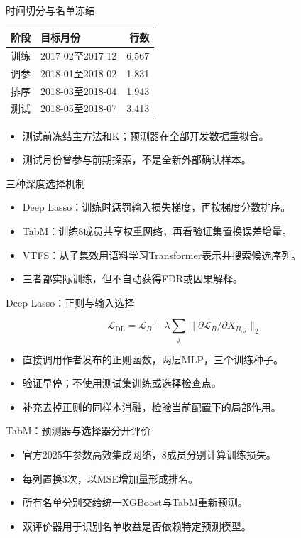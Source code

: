 \documentclass[aspectratio=169]{beamer}
\begin{document}
\begin{frame}{时间切分与名单冻结}
\small \begin{tabular}{llr}
\toprule
阶段 & 目标月份 & 行数\\\midrule
训练 & 2017-02至2017-12 & 6,567\\
调参 & 2018-01至2018-02 & 1,831\\
排序 & 2018-03至2018-04 & 1,943\\
测试 & 2018-05至2018-07 & 3,413\\
\bottomrule
\end{tabular}\begin{itemize}
\item 测试前冻结主方法和K；预测器在全部开发数据重拟合。
\item 测试月份曾参与前期探索，不是全新外部确认样本。
\end{itemize}
\end{frame}
\begin{frame}{三种深度选择机制}
\begin{itemize}
\item Deep Lasso：训练时惩罚输入损失梯度，再按梯度分数排序。
\item TabM：训练8成员共享权重网络，再看验证集置换误差增量。
\item VTFS：从子集效用语料学习Transformer表示并搜索候选序列。
\item 三者都实际训练，但不自动获得FDR或因果解释。
\end{itemize}
\end{frame}
\begin{frame}{Deep Lasso：正则与输入选择}

\[
\mathcal L_{\mathrm{DL}}=\mathcal L_B+
\lambda\sum_j\|\partial\mathcal L_B/\partial X_{B,j}\|_2
\]
\begin{itemize}
\item 直接调用作者发布的正则函数，两层MLP，三个训练种子。
\item 验证早停；不使用测试集训练或选择检查点。
\item 补充去掉正则的同样本消融，检验当前配置下的局部作用。
\end{itemize}
\end{frame}
\begin{frame}{TabM：预测器与选择器分开评价}
\begin{itemize}
\item 官方2025年参数高效集成网络，8成员分别计算训练损失。
\item 每列置换3次，以MSE增加量形成排名。
\item 所有名单分别交给统一XGBoost与TabM重新预测。
\item 双评价器用于识别名单收益是否依赖特定预测模型。
\end{itemize}
\end{frame}
\end{document}
